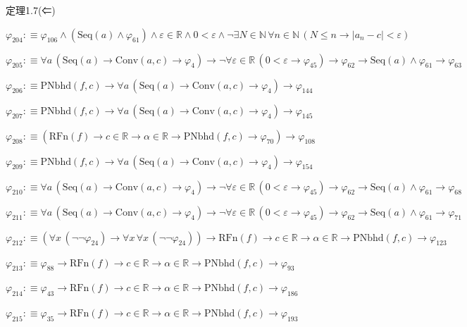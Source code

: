 \begin{fullproof}{定理1.7(⇐)}
\begin{abbrevlist}
\item $\varphi_{204} :\equiv \varphi_{106} \land (\mathrm{Seq}(a) \land \varphi_{61}) \land \varepsilon \in \mathbb{R} \land 0 < \varepsilon \land \neg \exists N \in \mathbb{N}\,\forall n \in \mathbb{N}\,(N \leq n \to \lvert a_{n} - c \rvert < \varepsilon)$
\item $\varphi_{205} :\equiv \forall a\,(\mathrm{Seq}(a) \to \mathrm{Conv}(a,c) \to \varphi_{4}) \to \neg \forall \varepsilon \in \mathbb{R}\,(0 < \varepsilon \to \varphi_{45}) \to \varphi_{62} \to \mathrm{Seq}(a) \land \varphi_{61} \to \varphi_{63}$
\item $\varphi_{206} :\equiv \mathrm{PNbhd}(f,c) \to \forall a\,(\mathrm{Seq}(a) \to \mathrm{Conv}(a,c) \to \varphi_{4}) \to \varphi_{144}$
\item $\varphi_{207} :\equiv \mathrm{PNbhd}(f,c) \to \forall a\,(\mathrm{Seq}(a) \to \mathrm{Conv}(a,c) \to \varphi_{4}) \to \varphi_{145}$
\item $\varphi_{208} :\equiv (\mathrm{RFn}(f) \to c \in \mathbb{R} \to \alpha \in \mathbb{R} \to \mathrm{PNbhd}(f,c) \to \varphi_{70}) \to \varphi_{108}$
\item $\varphi_{209} :\equiv \mathrm{PNbhd}(f,c) \to \forall a\,(\mathrm{Seq}(a) \to \mathrm{Conv}(a,c) \to \varphi_{4}) \to \varphi_{154}$
\item $\varphi_{210} :\equiv \forall a\,(\mathrm{Seq}(a) \to \mathrm{Conv}(a,c) \to \varphi_{4}) \to \neg \forall \varepsilon \in \mathbb{R}\,(0 < \varepsilon \to \varphi_{45}) \to \varphi_{62} \to \mathrm{Seq}(a) \land \varphi_{61} \to \varphi_{68}$
\item $\varphi_{211} :\equiv \forall a\,(\mathrm{Seq}(a) \to \mathrm{Conv}(a,c) \to \varphi_{4}) \to \neg \forall \varepsilon \in \mathbb{R}\,(0 < \varepsilon \to \varphi_{45}) \to \varphi_{62} \to \mathrm{Seq}(a) \land \varphi_{61} \to \varphi_{71}$
\item $\varphi_{212} :\equiv (\forall x\,(\neg \neg \varphi_{24}) \to \forall x\,\forall x\,(\neg \neg \varphi_{24})) \to \mathrm{RFn}(f) \to c \in \mathbb{R} \to \alpha \in \mathbb{R} \to \mathrm{PNbhd}(f,c) \to \varphi_{123}$
\item $\varphi_{213} :\equiv \varphi_{88} \to \mathrm{RFn}(f) \to c \in \mathbb{R} \to \alpha \in \mathbb{R} \to \mathrm{PNbhd}(f,c) \to \varphi_{93}$
\item $\varphi_{214} :\equiv \varphi_{43} \to \mathrm{RFn}(f) \to c \in \mathbb{R} \to \alpha \in \mathbb{R} \to \mathrm{PNbhd}(f,c) \to \varphi_{186}$
\item $\varphi_{215} :\equiv \varphi_{35} \to \mathrm{RFn}(f) \to c \in \mathbb{R} \to \alpha \in \mathbb{R} \to \mathrm{PNbhd}(f,c) \to \varphi_{193}$

\end{abbrevlist}
\end{fullproof}
